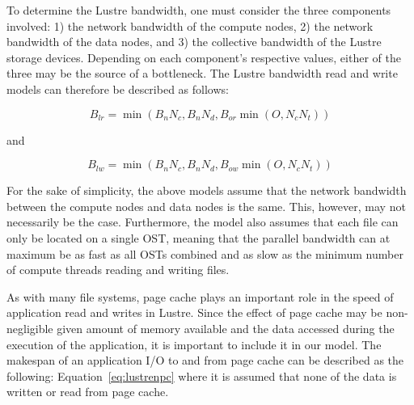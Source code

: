 \documentclass{report}
\begin{document}
    To determine the Lustre bandwidth, one must consider the three components involved:
1) the network bandwidth of the compute nodes, 2) the network bandwidth of the data nodes,
and 3) the collective bandwidth of the Lustre storage devices. Depending on each component's
respective values, either of the three may be the source of a bottleneck. The
Lustre bandwidth read and write models can therefore be described as follows:

    \begin{equation}\label{eq:blr}
        B_{lr} = \min{(B_{n}N_{c}, B_{n}N_{d}, B_{or}\min{(O, N_{c}N_{t})})}
    \end{equation}

    and

    \begin{equation}\label{eq:blw}
        B_{lw} = \min{(B_{n}N_{c}, B_{n}N_{d}, B_{ow}\min{(O, N_{c}N_{t})})}
    \end{equation}


    For the sake of simplicity, the above models assume that the network bandwidth
    between the compute nodes and data nodes is the same. This, however, may not
    necessarily be the case. Furthermore, the model also assumes that each file can
    only be located on a single OST, meaning that the parallel bandwidth can at maximum be
    as fast as all OSTs combined and as slow as the minimum number of compute threads
    reading and writing files.

    As with many file systems, page cache plays an important role in the speed of
    application read and writes in Lustre. Since the effect of page cache may be
    non-negligible given amount of memory available and the data accessed during the
    execution of the application, it is important to include it in our model. The makespan
    of an application I/O to and from page cache can be described as the following:
    Equation~\ref{eq:lustrenpc} where it is assumed that none of the data is written or read from page cache.
\end{document}
